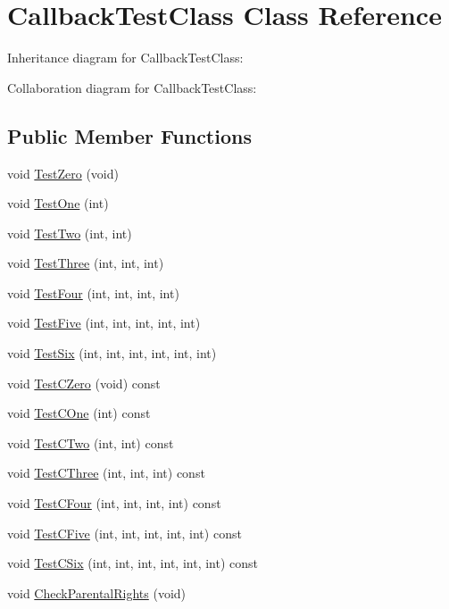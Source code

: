 \hypertarget{classCallbackTestClass}{}\section{Callback\+Test\+Class Class Reference}
\label{classCallbackTestClass}


Inheritance diagram for Callback\+Test\+Class\+:


Collaboration diagram for Callback\+Test\+Class\+:
\subsection*{Public Member Functions}
\begin{DoxyCompactItemize}
\item 
void \hyperlink{classCallbackTestClass_a36e681f38e94890d82693e6e1a156de1}{Test\+Zero} (void)
\item 
void \hyperlink{classCallbackTestClass_a86e0da8ff6230c30555b1d8f61570e33}{Test\+One} (int)
\item 
void \hyperlink{classCallbackTestClass_aed10ec383ea5a461288ed352c89d4f4c}{Test\+Two} (int, int)
\item 
void \hyperlink{classCallbackTestClass_a9b1576cfed8062feb704ac009c871a3b}{Test\+Three} (int, int, int)
\item 
void \hyperlink{classCallbackTestClass_ab030b685c4908632a3a534a4b37cdf3c}{Test\+Four} (int, int, int, int)
\item 
void \hyperlink{classCallbackTestClass_adb2a7aa906bc7c8343e0620698bbe0e3}{Test\+Five} (int, int, int, int, int)
\item 
void \hyperlink{classCallbackTestClass_a0e6e2d05838f45b835e3b18deb19be0e}{Test\+Six} (int, int, int, int, int, int)
\item 
void \hyperlink{classCallbackTestClass_afbbc1bf431678ab2a909c1312ce6d26e}{Test\+C\+Zero} (void) const 
\item 
void \hyperlink{classCallbackTestClass_a348b4096a8f6116d2c111b7bfa103b85}{Test\+C\+One} (int) const 
\item 
void \hyperlink{classCallbackTestClass_a21e3094080369179842d34afe5fc47cb}{Test\+C\+Two} (int, int) const 
\item 
void \hyperlink{classCallbackTestClass_ab59862f7105d02f634a1a584fa939843}{Test\+C\+Three} (int, int, int) const 
\item 
void \hyperlink{classCallbackTestClass_a073e131e0c9ab9dbfe438809bf6a9288}{Test\+C\+Four} (int, int, int, int) const 
\item 
void \hyperlink{classCallbackTestClass_a6773e8872ed6d883fe0c6c7dc506a28c}{Test\+C\+Five} (int, int, int, int, int) const 
\item 
void \hyperlink{classCallbackTestClass_aafd58c45c7a98ac7076dc01924817b22}{Test\+C\+Six} (int, int, int, int, int, int) const 
\item 
void \hyperlink{classCallbackTestClass_a4536e5309fbfc8ed19206d8d922cacb3}{Check\+Parental\+Rights} (void)
\end{DoxyCompactItemize}
